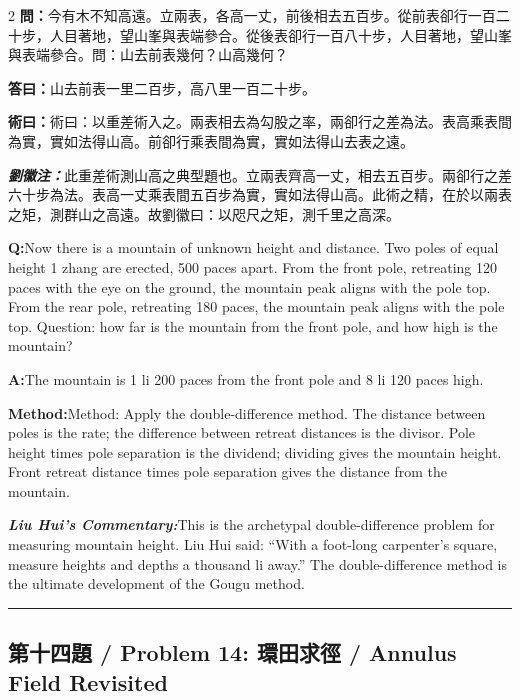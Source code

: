 \documentclass[11pt,a4paper]{article}
\newcommand{\cnwen}{\textcolor{cnlabelfg}{\textbf{問：}}}
\newcommand{\cnda}{\textbf{答曰：}}
\newcommand{\cnshu}{\textcolor{cnlabelfg}{\textbf{術曰：}}}
\newcommand{\cnzhu}{\textcolor{commentarycolor}{\textit{\textbf{劉徽注：}}}}
\newcommand{\enwen}{\textcolor{enlabelfg}{\textbf{Q:}}}
\newcommand{\enda}{\textcolor{enlabelfg}{\textbf{A:}}}
\newcommand{\enshu}{\textcolor{enlabelfg}{\textbf{Method:}}}
\newcommand{\enzhu}{\textcolor{enlabelfg}{\textit{\textbf{Liu Hui's Commentary:}}}}
\begin{document}
\begin{paracol}{2}
\switchcolumn[0]
\cnwen 今有木不知高遠。立兩表，各高一丈，前後相去五百步。從前表卻行一百二十步，人目著地，望山峯與表端參合。從後表卻行一百八十步，人目著地，望山峯與表端參合。問：山去前表幾何？山高幾何？

\cnda 山去前表一里二百步，高八里一百二十步。

\cnshu 術曰：以重差術入之。兩表相去為勾股之率，兩卻行之差為法。表高乘表間為實，實如法得山高。前卻行乘表間為實，實如法得山去表之遠。

\cnzhu 此重差術測山高之典型題也。立兩表齊高一丈，相去五百步。兩卻行之差六十步為法。表高一丈乘表間五百步為實，實如法得山高。此術之精，在於以兩表之矩，測群山之高遠。故劉徽曰：以咫尺之矩，測千里之高深。

\switchcolumn[1]
\enwen Now there is a mountain of unknown height and distance. Two poles of equal height 1 zhang are erected, 500 paces apart. From the front pole, retreating 120 paces with the eye on the ground, the mountain peak aligns with the pole top. From the rear pole, retreating 180 paces, the mountain peak aligns with the pole top. Question: how far is the mountain from the front pole, and how high is the mountain?

\enda The mountain is 1 li 200 paces from the front pole and 8 li 120 paces high.

\enshu Method: Apply the double-difference method. The distance between poles is the rate; the difference between retreat distances is the divisor. Pole height times pole separation is the dividend; dividing gives the mountain height. Front retreat distance times pole separation gives the distance from the mountain.

\enzhu This is the archetypal double-difference problem for measuring mountain height. Liu Hui said: ``With a foot-long carpenter's square, measure heights and depths a thousand li away.'' The double-difference method is the ultimate development of the Gougu method.
\end{paracol}

\bigskip\hrule\bigskip

\subsection{第十四題 / Problem 14: 環田求徑 / Annulus Field Revisited}
\end{document}
